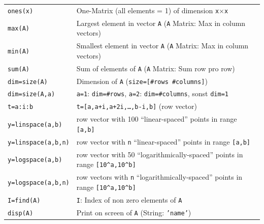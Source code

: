\documentclass[a4paper,12 pt]{article}
\numberwithin{equation}{section}
\theoremstyle{definition}
\theoremstyle{remark}
\theoremstyle{definition}
\theoremstyle{definition}
\theoremstyle{definition}
\theoremstyle{remark}
\begin{document}
\begin{center}
\begin{tabular}{ll}
\texttt{ones(x)} & One-Matrix (all elements = 1) of dimension \texttt{x}$\times$\texttt{x} \\
\texttt{max(A)} & Largest element in vector \texttt{A} (\texttt{A} Matrix: Max in column vectors) \\
\texttt{min(A)} & Smallest element in vector \texttt{A} (\texttt{A} Matrix: Max in column vectors) \\
\texttt{sum(A)} & Sum of elements of \texttt{A} (\texttt{A} Matrix: Sum row pro row) \\
\texttt{dim=size(A)} & Dimension of \texttt{A} (\texttt{size=[\#rows \#columns]})\\
\texttt{dim=size(A,a)} & \texttt{a=1}: \texttt{dim=\#rows}, \texttt{a=2}: \texttt{dim=\#columns}, sonst \texttt{dim=1}\\
\texttt{t=a:i:b} & \texttt{t=[a,a+i,a+2i,\ldots,b-i,b]} (row vector) \\
\texttt{y=linspace(a,b)} & row vector with 100 ``linear-spaced'' points in range \texttt{[a,b]} \\
\texttt{y=linspace(a,b,n)} & row vector with \texttt{n} ``linear-spaced'' points in range \texttt{[a,b]} \\
\texttt{y=logspace(a,b)} & row vector with 50 ``logarithmically-spaced'' points in range \texttt{[10\^{}a,10\^{}b]} \\
\texttt{y=logspace(a,b,n)} & row vectors with \texttt{n} ``logarithmically-spaced'' points in range \texttt{[10\^{}a,10\^{}b]} \\
\texttt{I=find(A)} & \texttt{I}: Index of non zero elements of \texttt{A} \\
\texttt{disp(A)} & Print on screen of \texttt{A} (String: \texttt{'name'}) \\
\bottomrule
\end{tabular}
\end{center}


\newpage
\end{document}
